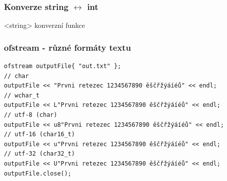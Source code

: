 \begin{frame}[fragile]
\frametitle{Konverze string $\leftrightarrow$ int}

\begin{block}{<string> konverzní funkce}
\end{block}
\end{frame}





\nezkouskove


\begin{frame}[fragile]
\frametitle{ofstream - různé formáty textu}
\begin{yesblock}
\begin{lstlisting}
ofstream outputFile{ "out.txt" };
// char
outputFile << "Prvni retezec 1234567890 ěščřžýáíéů" << endl;
// wchar_t
outputFile << L"Prvni retezec 1234567890 ěščřžýáíéů" << endl;
// utf-8 (char)
outputFile << u8"Prvni retezec 1234567890 ěščřžýáíéů" << endl;
// utf-16 (char16_t)
outputFile << u"Prvni retezec 1234567890 ěščřžýáíéů" << endl;
// utf-32 (char32_t)
outputFile << U"Prvni retezec 1234567890 ěščřžýáíéů" << endl;
outputFile.close();
\end{lstlisting}
\end{yesblock}
\end{frame}




